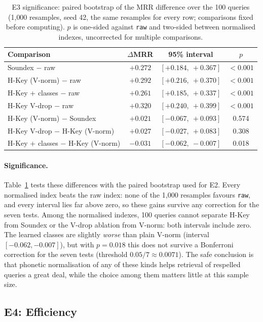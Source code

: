 \begin{table}[t]
\centering
\caption{E3 significance: paired bootstrap of the MRR difference over the 100 queries (1{,}000
resamples, seed 42, the same resamples for every row; comparisons fixed before computing).
$p$ is one-sided against \texttt{raw} and two-sided between normalised indexes, uncorrected for
multiple comparisons.}
\label{tab:e3-boot}
\small
\begin{tabular}{@{}lccc@{}}
\toprule
Comparison & $\Delta$MRR & 95\% interval & $p$ \\
\midrule
Soundex $-$ raw & $+0.272$ & $[+0.184,\ +0.367]$ & $<0.001$ \\
H-Key (V-norm) $-$ raw & $+0.292$ & $[+0.216,\ +0.370]$ & $<0.001$ \\
H-Key + classes $-$ raw & $+0.261$ & $[+0.185,\ +0.337]$ & $<0.001$ \\
H-Key V-drop $-$ raw & $+0.320$ & $[+0.240,\ +0.399]$ & $<0.001$ \\
\midrule
H-Key (V-norm) $-$ Soundex & $+0.021$ & $[-0.067,\ +0.093]$ & 0.574 \\
H-Key V-drop $-$ H-Key (V-norm) & $+0.027$ & $[-0.027,\ +0.083]$ & 0.308 \\
H-Key + classes $-$ H-Key (V-norm) & $-0.031$ & $[-0.062,\ -0.007]$ & 0.018 \\
\bottomrule
\end{tabular}
\end{table}

\paragraph{Significance.} Table~\ref{tab:e3-boot} tests these differences with the paired bootstrap
used for E2. Every normalised index beats the raw index: none of the 1{,}000 resamples favours
\texttt{raw}, and every interval lies far above zero, so these gains survive any correction for the
seven tests. Among the normalised indexes, 100 queries cannot separate H-Key from Soundex or the
V-drop ablation from V-norm: both intervals include zero. The learned classes are slightly
\emph{worse} than plain V-norm (interval $[-0.062,-0.007]$), but with $p=0.018$ this does not survive
a Bonferroni correction for the seven tests (threshold $0.05/7\approx0.0071$). The safe conclusion is
that phonetic normalisation of any of these kinds helps retrieval of respelled queries a great deal,
while the choice among them matters little at this sample size.

\subsection{E4: Efficiency}
\label{sec:e4}

